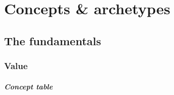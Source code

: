 \chapter{Concepts \& archetypes}
\label{appendix:concepts.and.archetypes}

\section{The fundamentals}

\subsection{Value}

\paragraph{Concept table}

